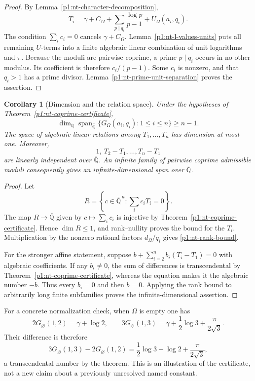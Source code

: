 \documentclass[11pt,a4paper]{article}
\newtheorem{corollary}[theorem]{Corollary}
\theoremstyle{definition}
\theoremstyle{remark}
\numberwithin{equation}{section}
\begin{document}
\begin{proof}
By Lemma~\ref{p1:nt-character-decomposition},
\[
 T_i=\gamma+C_\Omega+
 \sum_{p\mid q_i}\frac{\log p}{p-1}+U_\Omega(a_i,q_i).
\]
The condition $\sum_i c_i=0$ cancels $\gamma+C_\Omega$.
Lemma~\ref{p1:nt-l-values-units} puts all remaining $U$-terms into
a finite algebraic linear combination of unit logarithms and $\pi$.
Because the moduli are pairwise coprime, a prime $p\mid q_i$ occurs
in no other modulus.  Its coefficient is therefore $c_i/(p-1)$.
Some $c_i$ is nonzero, and that $q_i>1$ has a prime divisor.
Lemma~\ref{p1:nt-prime-unit-separation} proves the assertion.
\end{proof}

\begin{corollary}[Dimension and the relation space]
\label{p1:nt-coprime-rank}
Under the hypotheses of Theorem~\ref{p1:nt-coprime-certificate},
\begin{equation}
\label{p1:nt-rank-bound}
 \dim_{\overline{\mathbb Q}}
 \operatorname{span}_{\overline{\mathbb Q}}
 \{G_\Omega(a_i,q_i):1\le i\le n\}\ge n-1.
\end{equation}
The space of algebraic linear relations among $T_1,\ldots,T_n$
has dimension at most one.  Moreover,
\[
 1,\ T_2-T_1,\ldots,T_n-T_1
\]
are linearly independent over $\overline{\mathbb Q}$.
An infinite family of pairwise coprime admissible moduli consequently
gives an infinite-dimensional span over $\overline{\mathbb Q}$.
\end{corollary}

\begin{proof}
Let
\[
 R=\left\{c\in\overline{\mathbb Q}^{\,n}:
 \sum_i c_iT_i=0\right\}.
\]
The map $R\longrightarrow\overline{\mathbb Q}$ given by
$c\longmapsto\sum_i c_i$ is injective by
Theorem~\ref{p1:nt-coprime-certificate}.  Hence $\dim R\le1$, and
rank--nullity proves the bound for the $T_i$.  Multiplication by the
nonzero rational factors $d_\Omega/q_i$ gives
\eqref{p1:nt-rank-bound}.

For the stronger affine statement, suppose
$b+\sum_{i=2}^n b_i(T_i-T_1)=0$ with algebraic coefficients.
If any $b_i\ne0$, the sum of differences is transcendental by
Theorem~\ref{p1:nt-coprime-certificate}, whereas the equation makes
it the algebraic number $-b$.  Thus every $b_i=0$ and then $b=0$.
Applying the rank bound to arbitrarily long finite subfamilies proves
the infinite-dimensional assertion.
\end{proof}

For a concrete normalization check, when $\Omega$ is empty one has
\[
 2G_\varnothing(1,2)=\gamma+\log2,
 \qquad
 3G_\varnothing(1,3)=\gamma+\frac12\log3+
 \frac{\pi}{2\sqrt3}.
\]
Their difference is therefore
\[
 3G_\varnothing(1,3)-2G_\varnothing(1,2)
 =\frac12\log3-\log2+\frac{\pi}{2\sqrt3},
\]
a transcendental number by the theorem.  This is an illustration of
the certificate, not a new claim about a previously unresolved named
constant.
\end{document}
